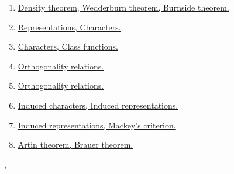 \documentclass[11pt]{article}
\renewcommand{\today}{\shortmonthname[\the\month] \the \day,  \the\year}
\begin{document}
\begin{enumerate}
	\item 	\href{https://mp.weixin.qq.com/s/mKs3Ol5cDNb37yENLbXd2A}{Density theorem, Wedderburn theorem, Burnside theorem.}	%
	\item	\href{https://mp.weixin.qq.com/s/kp2MWB11ET5bUHxVi6spFQ}{Representations, Characters.}	%
	\item	\href{https://mp.weixin.qq.com/s/6wmZCSfqy8RFyCBHCoP0lg}{Characters, Class functions.}	%
	\item	\href{https://mp.weixin.qq.com/s/KEnep16wrmhZ6j5c5oN-Nw}{Orthogonality relations.} 	%
	\item 	\href{https://mp.weixin.qq.com/s/loIyfsXSm_vptWE7nK7rlg}{Orthogonality relations.}	%
	\item 	\href{https://mp.weixin.qq.com/s/yUKeBr6dmQrcZmVtNvR2XQ}{Induced characters, Induced representations.}	%
	\item 	\href{https://mp.weixin.qq.com/s/NZB4A7g2flunQVE1sa16Hg}{Induced representations, Mackey's criterion.}	%
	\item 	\href{https://mp.weixin.qq.com/s/UqRVSmgSdpc1WdSJl5hvbg}{Artin theorem, Brauer theorem.}	%
\end{enumerate}


%
\begin{flushright}
	\tiny \today 
\end{flushright}
\end{document}
